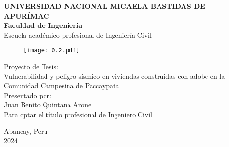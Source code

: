 
\begin{titlepage}

	\begin{center}
		\textbf{\large{UNIVERSIDAD NACIONAL MICAELA BASTIDAS DE APURÍMAC}}\\
		\vspace{2mm}
		\large{\textbf{Faculdad de Ingeniería}}\\
		\vspace{2mm}
		\large{\textbf{}{Escuela académico profesional de Ingeniería Civil}}\\
		\vspace{5mm}
		\begin{figure}[h!]
			\centering
			\texttt{[image: 0.2.pdf]}
		\end{figure}
		
		\vspace{5mm}
		\large{Proyecto de Tesis:}\\
		Vulnerabilidad y peligro sísmico en viviendas construidas con adobe en la Comunidad Campesina de Paccaypata\\
		\vspace{10mm}
		Presentado por:\\
		\vspace{10mm}
		Juan Benito Quintana Arone\\
		\vspace{5mm}
		Para optar el título profesional de Ingeniero Civil 
		
		\vspace{10mm}
		
		\vfill
		Abancay, Perú\\
		\vspace{5mm}
		2024\\
	\end{center}
\end{titlepage}


